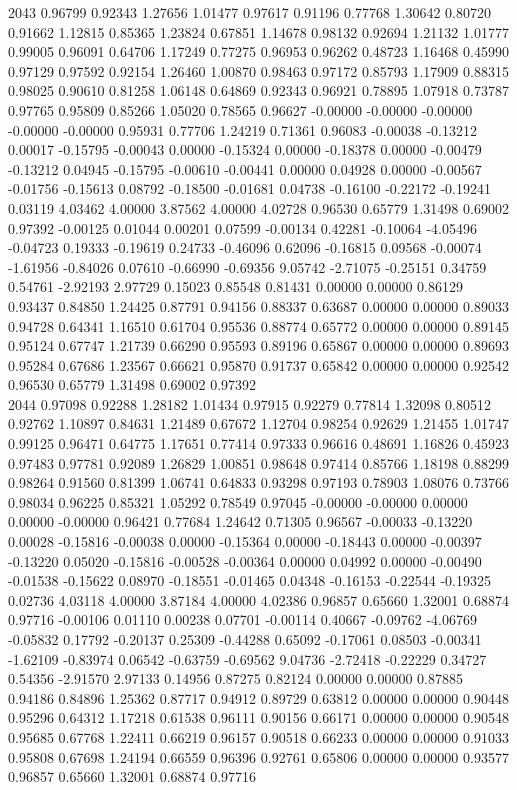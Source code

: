 {2043 0.96799 0.92343 1.27656 1.01477 0.97617 0.91196 0.77768 1.30642 0.80720 0.91662 1.12815 0.85365 1.23824 0.67851 1.14678 0.98132 0.92694 1.21132 1.01777 0.99005 0.96091 0.64706 1.17249 0.77275 0.96953 0.96262 0.48723 1.16468 0.45990 0.97129 0.97592 0.92154 1.26460 1.00870 0.98463 0.97172 0.85793 1.17909 0.88315 0.98025 0.90610 0.81258 1.06148 0.64869 0.92343 0.96921 0.78895 1.07918 0.73787 0.97765 0.95809 0.85266 1.05020 0.78565 0.96627 -0.00000 -0.00000 -0.00000 -0.00000 -0.00000 0.95931 0.77706 1.24219 0.71361 0.96083 -0.00038 -0.13212 0.00017 -0.15795 -0.00043 0.00000 -0.15324 0.00000 -0.18378 0.00000 -0.00479 -0.13212 0.04945 -0.15795 -0.00610 -0.00441 0.00000 0.04928 0.00000 -0.00567 -0.01756 -0.15613 0.08792 -0.18500 -0.01681 0.04738 -0.16100 -0.22172 -0.19241 0.03119 4.03462 4.00000 3.87562 4.00000 4.02728 0.96530 0.65779 1.31498 0.69002 0.97392 -0.00125 0.01044 0.00201 0.07599 -0.00134 0.42281 -0.10064 -4.05496 -0.04723 0.19333 -0.19619 0.24733 -0.46096 0.62096 -0.16815 0.09568 -0.00074 -1.61956 -0.84026 0.07610 -0.66990 -0.69356 9.05742 -2.71075 -0.25151 0.34759 0.54761 -2.92193 2.97729 0.15023 0.85548 0.81431 0.00000 0.00000 0.86129 0.93437 0.84850 1.24425 0.87791 0.94156 0.88337 0.63687 0.00000 0.00000 0.89033 0.94728 0.64341 1.16510 0.61704 0.95536 0.88774 0.65772 0.00000 0.00000 0.89145 0.95124 0.67747 1.21739 0.66290 0.95593 0.89196 0.65867 0.00000 0.00000 0.89693 0.95284 0.67686 1.23567 0.66621 0.95870 0.91737 0.65842 0.00000 0.00000 0.92542 0.96530 0.65779 1.31498 0.69002 0.97392 \\
2044 0.97098 0.92288 1.28182 1.01434 0.97915 0.92279 0.77814 1.32098 0.80512 0.92762 1.10897 0.84631 1.21489 0.67672 1.12704 0.98254 0.92629 1.21455 1.01747 0.99125 0.96471 0.64775 1.17651 0.77414 0.97333 0.96616 0.48691 1.16826 0.45923 0.97483 0.97781 0.92089 1.26829 1.00851 0.98648 0.97414 0.85766 1.18198 0.88299 0.98264 0.91560 0.81399 1.06741 0.64833 0.93298 0.97193 0.78903 1.08076 0.73766 0.98034 0.96225 0.85321 1.05292 0.78549 0.97045 -0.00000 -0.00000 0.00000 0.00000 -0.00000 0.96421 0.77684 1.24642 0.71305 0.96567 -0.00033 -0.13220 0.00028 -0.15816 -0.00038 0.00000 -0.15364 0.00000 -0.18443 0.00000 -0.00397 -0.13220 0.05020 -0.15816 -0.00528 -0.00364 0.00000 0.04992 0.00000 -0.00490 -0.01538 -0.15622 0.08970 -0.18551 -0.01465 0.04348 -0.16153 -0.22544 -0.19325 0.02736 4.03118 4.00000 3.87184 4.00000 4.02386 0.96857 0.65660 1.32001 0.68874 0.97716 -0.00106 0.01110 0.00238 0.07701 -0.00114 0.40667 -0.09762 -4.06769 -0.05832 0.17792 -0.20137 0.25309 -0.44288 0.65092 -0.17061 0.08503 -0.00341 -1.62109 -0.83974 0.06542 -0.63759 -0.69562 9.04736 -2.72418 -0.22229 0.34727 0.54356 -2.91570 2.97133 0.14956 0.87275 0.82124 0.00000 0.00000 0.87885 0.94186 0.84896 1.25362 0.87717 0.94912 0.89729 0.63812 0.00000 0.00000 0.90448 0.95296 0.64312 1.17218 0.61538 0.96111 0.90156 0.66171 0.00000 0.00000 0.90548 0.95685 0.67768 1.22411 0.66219 0.96157 0.90518 0.66233 0.00000 0.00000 0.91033 0.95808 0.67698 1.24194 0.66559 0.96396 0.92761 0.65806 0.00000 0.00000 0.93577 0.96857 0.65660 1.32001 0.68874 0.97716 \\
}
